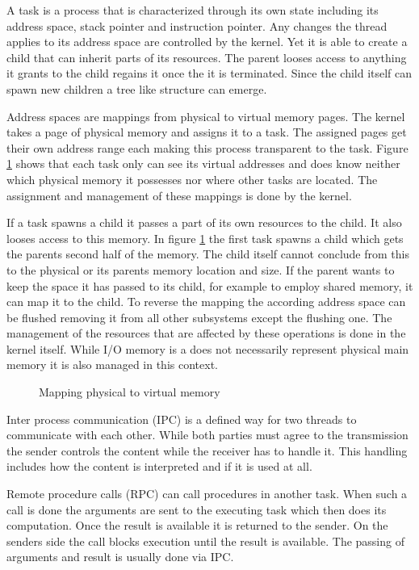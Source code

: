 \documentclass[
a4paper,
12pt,
notitlepage,
parskip=half,
DIV=11,
]{scrbook}
\begin{document}
		A task is a process that is characterized through its own state including its address space, stack pointer and instruction pointer.
		Any changes the thread applies to its address space are controlled by the kernel.
		Yet it is able to create a child that can inherit parts of its resources.
		The parent looses access to anything it grants to the child regains it once the it is terminated.
		Since the child itself can spawn new children a tree like structure can emerge.
		
		Address spaces are mappings from physical to virtual memory pages.
		The kernel takes a page of physical memory and assigns it to a task.
		The assigned pages get their own address range each making this process transparent to the task.
		Figure \ref{mapping} shows that each task only can see its virtual addresses and does know neither which physical memory it possesses nor where other tasks are located.
		The assignment and management of these mappings is done by the kernel.
		
		If a task spawns a child it passes a part of its own resources to the child.
		It also looses access to this memory.
		In figure \ref{mapping} the first task spawns a child which gets the parents second half of the memory.
		The child itself cannot conclude from this to the physical or its parents memory location and size.
		If the parent wants to keep the space it has passed to its child, for example to employ shared memory, it can map it to the child.
		To reverse the mapping the according address space can be flushed removing it from all other subsystems except the flushing one.
		The management of the resources that are affected by these operations is done in the kernel itself.
		While I/O memory is a does not necessarily represent physical main memory it is also managed in this context.
		
		\begin{figure}
			\centering
			\def\svgwidth{0.8\textwidth}
			
			\caption{Mapping physical to virtual memory}
			\label{mapping}    
		\end{figure}
		
		Inter process communication (IPC) is a defined way for two threads to communicate with each other.
		While both parties must agree to the transmission the sender controls the content while the receiver has to handle it.
		This handling includes how the content is interpreted and if it is used at all.
		
		Remote procedure calls (RPC) can call procedures in another task.
		When such a call is done the arguments are sent to the executing task which then does its computation.
		Once the result is available it is returned to the sender.
		On the senders side the call blocks execution until the result is available.
		The passing of arguments and result is usually done via IPC.
		
\end{document}
